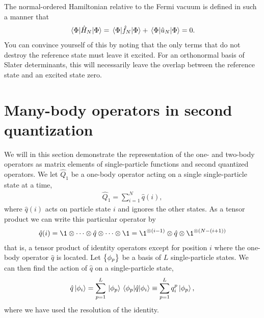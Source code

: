         The normal-ordered Hamiltonian relative to the Fermi vacuum is defined
        in such a manner that
        \begin{align}
            \mel*{\Phi}{\hat{H}_N}{\Phi}
            = \mel*{\Phi}{\hat{f}_N}{\Phi}
            + \mel*{\Phi}{\hat{u}_N}{\Phi}
            = 0.
        \end{align}
        You can convince yourself of this by noting that the only terms that
        do not destroy the reference state must leave it excited.
        For an orthonormal basis of Slater determinants, this will necessarily
        leave the overlap between the reference state and an excited state zero.

    \section{Many-body operators in second quantization}
        \label{app:operator-representation}
        We will in this section demonstrate the representation of the one- and
        two-body operators as matrix elements of single-particle functions and
        second quantized operators.
        We let $\hat{Q}_1$ be a one-body operator acting on a single
        single-particle state at a time,
        \begin{align}
            \hat{Q}_1
            = \sum_{i = 1}^{N}\hat{q}(i),
        \end{align}
        where $\hat{q}(i)$ acts on particle state $i$ and ignores the other
        states.
        As a tensor product we can write this particular operator by
        \begin{align}
            \hat{q}(i)
            = \1\otimes
            \dots\otimes\hat{q}\otimes\dots\otimes\1
            = \1^{\otimes (i - 1)}
            \otimes\hat{q}
            \otimes\1^{\otimes (N - (i + 1))}
            \label{eq:tensor-one-body}
        \end{align}
        that is, a tensor product of identity operators except for position $i$
        where the one-body operator $\hat{q}$ is located.
        Let $\left\{ \phi_p \right\}$ be a basis of $L$ single-particle states.
        We can then find the action of $\hat{q}$ on a single-particle state,
        \begin{align}
            \hat{q}\ket*{\phi_i}
            = \sum_{p = 1}^{L}\ket*{\phi_{p}}\mel*{\phi_p}{\hat{q}}{\phi_i}
            \equiv \sum_{p = 1}^{L} q^{p}_{i}\ket*{\phi_p},
        \end{align}
        where we have used the resolution of the identity.
